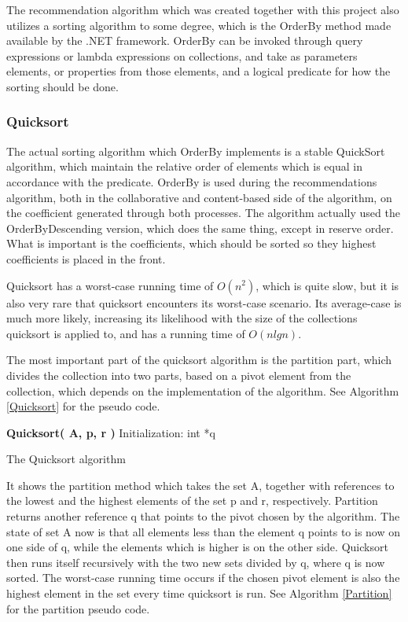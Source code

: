 The recommendation algorithm which was created together with this project also utilizes a sorting algorithm to some degree, which is the OrderBy method made available by the .NET framework. OrderBy can be invoked through query expressions or lambda expressions on collections, and take as parameters elements, or properties from those elements, and a logical predicate for how the sorting should be done. \cite{AlgoAnal1}

\subsubsection{Quicksort}

The actual sorting algorithm which OrderBy implements is a stable QuickSort algorithm, which maintain the relative order of elements which is equal in accordance with the predicate. OrderBy is used during the recommendations algorithm, both in the collaborative and content-based side of the algorithm, on the coefficient generated through both processes. The algorithm actually used the OrderByDescending version, which does the same thing, except in reserve order. What is important is the coefficients, which should be sorted so they highest coefficients is placed in the front.

Quicksort has a worst-case running time of $O(n^2)$, which is quite slow, but it is also very rare that quicksort encounters its worst-case scenario. Its average-case is much more likely, increasing its likelihood with the size of the collections quicksort is applied to, and has a running time of $O(nlgn)$.

The most important part of the quicksort algorithm is the partition part, which divides the collection into two parts, based on a pivot element from the collection, which depends on the implementation of the algorithm. See Algorithm \ref{Quicksort} for the pseudo code.

\begin{algorithm}
	\DontPrintSemicolon
	\textbf{Quicksort( A, p, r )}\;
	Initialization:\;
	int *q\;
	\label{Quicksort}
	\caption{The Quicksort algorithm}
\end{algorithm}

It shows the partition method which takes the set A, together with references to the lowest and the highest elements of the set p and r, respectively. Partition returns another reference q that points to the pivot chosen by the algorithm. The state of set A now is that all elements less than the element q points to is now on one side of q, while the elements which is higher is on the other side. Quicksort then runs itself recursively with the two new sets divided by q, where q is now sorted. The worst-case running time occurs if the chosen pivot element is also the highest element in the set every time quicksort is run. See Algorithm \ref{Partition} for the partition pseudo code.

